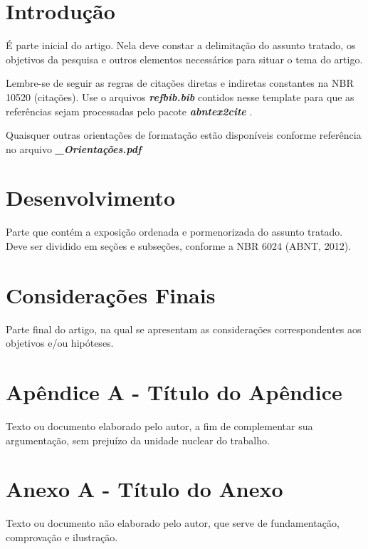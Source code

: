\documentclass[a4paper, 12pt, twoside]{article}
\begin{document}
\section{Introdução}

\par [OBRIGATÓRIO] É parte inicial do artigo. Nela deve constar a delimitação do assunto tratado, os objetivos da pesquisa e outros elementos necessários para situar o tema do artigo.

\par Lembre-se de seguir as regras de citações diretas e indiretas constantes na NBR 10520 (citações). Use o arquivos \textbf{\textit{refbib.bib}} contidos nesse template para que as referências sejam processadas pelo pacote \textit{\textbf{abntex2cite}} .

\par Quaisquer outras orientações de formatação estão disponíveis conforme referência no arquivo \textbf{\textit{\_Orientações.pdf}}


\section{Desenvolvimento}

\par [OBRIGATÓRIO] Parte que contém a exposição ordenada e pormenorizada do assunto tratado. Deve ser dividido em seções e subseções, conforme a NBR 6024 (ABNT, 2012).


\section{Considerações Finais}

\par [OBRIGATÓRIO] Parte final do artigo, na qual se apresentam as considerações correspondentes aos objetivos e/ou hipóteses.





\section*{Apêndice A - Título do Apêndice} 

\par [OPCIONAL] Texto ou documento elaborado pelo autor, a fim de complementar sua argumentação, sem prejuízo da unidade nuclear do trabalho.

\section*{Anexo A - Título do Anexo}

\par [OPCIONAL] Texto ou documento não elaborado pelo autor, que serve de fundamentação, comprovação e ilustração.
\end{document}
